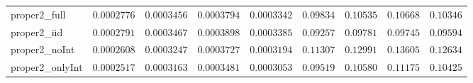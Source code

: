 \begin{table}
\begin{tabular}{lcccccccc}
proper2_full  & $0.0002776$ & $0.0003456$ & $0.0003794$ & $0.0003342$ & $0.09834$ & $0.10535$ & $0.10668$ & $0.10346$ \\
proper2_iid  & $0.0002791$ & $0.0003467$ & $0.0003898$ & $0.0003385$ & $0.09257$ & $0.09781$ & $0.09745$ & $0.09594$ \\
proper2_noInt  & $0.0002608$ & $0.0003247$ & $0.0003727$ & $0.0003194$ & $0.11307$ & $0.12991$ & $0.13605$ & $0.12634$ \\
proper2_onlyInt  & $0.0002517$ & $0.0003163$ & $0.0003481$ & $0.0003053$ & $0.09519$ & $0.10580$ & $0.11175$ & $0.10425$ \\
\hline 
\end{tabular}


\end{table}